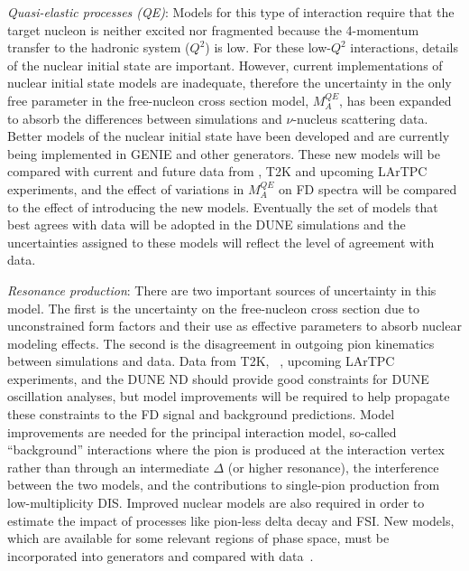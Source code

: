   \emph{Quasi-elastic processes (QE)}: Models for this type of interaction require that the target nucleon 
  is neither excited nor fragmented because the 4-momentum transfer to the hadronic system ($Q^{2}$) is low.
  For these low-$Q^{2}$ interactions, details of the nuclear initial state are important. However,
  current implementations of nuclear initial state models are inadequate, therefore the uncertainty in the only
  free parameter in the free-nucleon cross section model, $M_{A}^{QE}$, has been expanded to absorb the
  differences between simulations and $\nu$-nucleus scattering data. Better models of the nuclear
  initial state have been developed
  and are currently being implemented in GENIE and other generators. These new models will be compared with current 
  and future data from \minerva, T2K and upcoming LArTPC experiments, and the effect of variations in $M_{A}^{QE}$
  on FD spectra will be compared to the effect of introducing the new models.
  Eventually the set of models that best agrees with data will be adopted in the DUNE simulations and
  the uncertainties assigned to these models will reflect the level of agreement with data.

  \emph{Resonance production}:
  There are two important sources of uncertainty in this model. The first is the uncertainty on the free-nucleon
  cross section due to unconstrained form factors and their use as effective parameters to absorb nuclear
  modeling effects.
  The second is the disagreement in outgoing pion kinematics between simulations and data.
  Data from T2K, \minerva~\cite{Eberly:2014mra}\cite{Aliaga:2015wva}, upcoming LArTPC experiments, and the DUNE ND should provide good constraints for DUNE
  oscillation analyses, but model improvements will be required to help propagate these constraints
  to the FD signal and background predictions. Model improvements are needed for the principal interaction
  model, so-called ``background'' interactions where the pion is produced at the interaction vertex
  rather than through an intermediate $\Delta$ (or higher resonance), the interference between the two
  models, and the contributions to single-pion production from low-multiplicity DIS. Improved nuclear models
  are also required in order to estimate the impact of processes like pion-less delta decay and FSI. New models, which are
  available for some relevant regions of phase space, must be incorporated into generators and compared
  with data~\cite{Hernandez-Nieves-Valverde:2007}.


